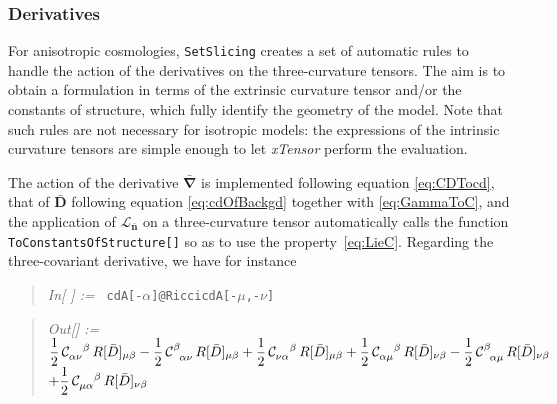 \documentclass[notitlepage,onecolumn,floatfix,preprintnumbers,aps,prd,showpacs,nofootinbib,amsmath,amssymb,amsfonts]{revtex4-1}
\newcommand{\Lie}{\mathcal{L}}
\newcommand{\<}{\langle}
\renewcommand{\>}{\rangle}
\newcounter{inout}
\newcommand{\inoutput}{%
	\stepcounter{inout}%
	\theinout}
\newcommand{\mathIn}[1]{
	\begin{quotation} {\em In[\inoutput] :=\ } {\tt #1} \end{quotation}}
\newcommand{\mathOutTwoLines}[2]{
	\begin{quotation} {\em Out[\theinout] :=\ } {\tt #1} \\ 
	\phantom{\em Out[\theinout] := \quad \;\,}  {\tt #2}\end{quotation}}
\newcommand{\ttgr}[1]{{#1}}
\newcommand{\bb}{{\ttgr{\alpha}}}
\newcommand{\cc}{{\ttgr{\beta}}}
\newcommand{\ii}{{\ttgr{\mu}}}
\newcommand{\jj}{{\ttgr{\nu}}}
\begin{document}
\subsubsection{Derivatives}

For anisotropic cosmologies, {\tt SetSlicing} creates a set of automatic rules to handle the action 
of the derivatives on the three-curvature tensors. The aim is to obtain a formulation in terms of the 
extrinsic curvature tensor and/or the constants of structure, which fully identify the geometry of the model. 
Note that such rules are not necessary for isotropic models: the expressions of the intrinsic curvature 
tensors are simple enough to let \textit{xTensor} perform the evaluation. 

The action of the derivative $\bm{\bar \nabla}$ is implemented following equation \eqref{eq:CDTocd}, 
that of $\bar{\bm D}$ following equation \eqref{eq:cdOfBackgd} together with \eqref{eq:GammaToC}, 
and the application of $\Lie_{\bm{\bar n}}$ on a three-curvature tensor automatically calls the 
function {\tt ToConstantsOfStructure[]} so as to use the property~\eqref{eq:LieC}. 
Regarding the three-covariant derivative, we have for instance 
%
\mathIn{cdA[-$\bb$]@RiccicdA[-$\ii$,-$\jj$]}
\mathOutTwoLines{$ \displaystyle 
	\frac{1}{2} \, {\cal C}_{\bb \jj}^{\phantom{\bb \jj} \cc} \, R[\bar D]_{\ii \cc} - 
	\frac{1}{2} \, {\cal C}^\cc_{\phantom{\cc} \bb \jj} \, R[\bar D]_{\ii \cc} + 
	\frac{1}{2} \, {\cal C}_{\jj \bb}^{\phantom{\jj \bb} \cc} \, R[\bar D]_{\ii \cc} + 
	\frac{1}{2} \, {\cal C}_{\bb \ii}^{\phantom{\bb \ii} \cc} \, R[\bar D]_{\jj \cc} -
	\frac{1}{2} \, {\cal C}^\cc_{\phantom{\cc} \bb \ii} \, R[\bar D]_{\jj \cc}$} 
	{$ \displaystyle + 
	\frac{1}{2} \, {\cal C}_{\ii \bb}^{\phantom{\ii \bb} \cc} \, R[\bar D]_{\jj \cc} $}
%
\end{document}
